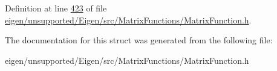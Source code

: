 Definition at line \hyperlink{eigen_2unsupported_2_eigen_2src_2_matrix_functions_2_matrix_function_8h_source_l00423}{423} of file \hyperlink{eigen_2unsupported_2_eigen_2src_2_matrix_functions_2_matrix_function_8h_source}{eigen/unsupported/\+Eigen/src/\+Matrix\+Functions/\+Matrix\+Function.\+h}.



The documentation for this struct was generated from the following file\+:\begin{DoxyCompactItemize}
\item 
eigen/unsupported/\+Eigen/src/\+Matrix\+Functions/\+Matrix\+Function.\+h\end{DoxyCompactItemize}
